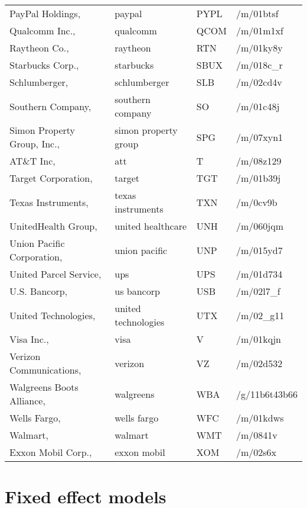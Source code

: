 \begin{longtable}[c]{llll}
PayPal Holdings, & paypal & PYPL & /m/01btsf \\
Qualcomm Inc., & qualcomm & QCOM & /m/01m1xf \\
Raytheon Co., & raytheon & RTN & /m/01ky8y \\
Starbucks Corp., & starbucks & SBUX & /m/018c\_r \\
Schlumberger, & schlumberger & SLB & /m/02cd4v \\
Southern Company, & southern company & SO & /m/01c48j \\
Simon Property Group, Inc., & simon property group & SPG & /m/07xyn1 \\
AT\&T Inc, & att & T & /m/08z129 \\
Target Corporation, & target & TGT & /m/01b39j \\
Texas Instruments, & texas instruments & TXN & /m/0cv9b \\
UnitedHealth Group, & united healthcare & UNH & /m/060jqm \\
Union Pacific Corporation, & union pacific & UNP & /m/015yd7 \\
United Parcel Service, & ups & UPS & /m/01d734 \\
U.S. Bancorp, & us bancorp & USB & /m/02l7\_f \\
United Technologies, & united technologies & UTX & /m/02\_g11 \\
Visa Inc., & visa & V & /m/01kqjn \\
Verizon Communications, & verizon & VZ & /m/02d532 \\
Walgreens Boots Alliance, & walgreens & WBA & /g/11b6t43b66 \\
Wells Fargo, & wells fargo & WFC & /m/01kdws \\
Walmart, & walmart & WMT & /m/0841v \\
Exxon Mobil Corp., & exxon mobil & XOM & /m/02s6x
\end{longtable}


\section{Fixed effect models}

